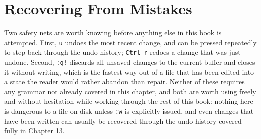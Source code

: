 \section{Recovering From Mistakes}

Two safety nets are worth knowing before anything else in this book is attempted. First, \texttt{u} undoes the most recent change, and can be pressed repeatedly to step back through the undo history; \texttt{Ctrl-r} redoes a change that was just undone. Second, \texttt{:q!} discards all unsaved changes to the current buffer and closes it without writing, which is the fastest way out of a file that has been edited into a state the reader would rather abandon than repair. Neither of these requires any grammar not already covered in this chapter, and both are worth using freely and without hesitation while working through the rest of this book: nothing here is dangerous to a file on disk unless \texttt{:w} is explicitly issued, and even changes that have been written can usually be recovered through the undo history covered fully in Chapter 13.
